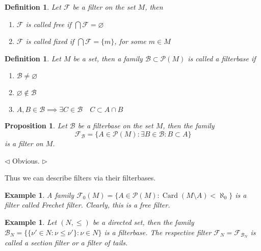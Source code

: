 \documentclass[12pt]{article}
\newtheorem{proposition}[theorem]{Proposition}
\newtheorem{definition}[theorem]{Definition}
\newtheorem{example}[theorem]{Example}
\newenvironment{proof}{\par $\triangleleft$}{$\triangleright$}
\begin{document}
\begin{definition}\label{DefFilterTypes} Let $\mathcal{F}$ be a filter on the
    set $M$, then
    \begin{enumerate}[label = (\roman*)]
        \item $\mathcal{F}$ is called free if $\bigcap\mathcal{F}=\varnothing$
        \item $\mathcal{F}$ is called fixed if $\bigcap\mathcal{F}=\{m\}$, for
              some $m\in M$
    \end{enumerate}
\end{definition}

\begin{definition}\label{DefFilterBase} Let $M$ be a set, then a family
    $\mathcal{B}\subset\mathcal{P}(M)$ is called a filterbase if
    \begin{enumerate}[label = (\roman*)]
        \item $\mathcal{B}\neq\varnothing$
        \item $\varnothing\notin\mathcal{B}$
        \item $A,B\in\mathcal{B}\implies \exists C\in\mathcal{B}\quad C\subset
                  A\cap B$
    \end{enumerate}
\end{definition}

\begin{proposition}\label{PrFilterFromFilterBase} Let $\mathcal{B}$ be a
    filterbase on the set $M$, then the family
    $$
        \mathcal{F}_{\mathcal{B}}=
        \{A\in\mathcal{P}(M):\exists B\in\mathcal{B}: B\subset A\}
    $$
    is a filter on $M$.
\end{proposition}
\begin{proof} Obvious.
\end{proof}

Thus we can describe filters via their filterbases.

\begin{example}\label{ExFrechetFilter} A family
    $\mathcal{F}_0(M)=\{A\in\mathcal{P}(M):\operatorname{Card}(M\setminus A)
    <\aleph_0\}$ is a filter called Frechet filter. Clearly, this is 
    a free filter.
\end{example}

\begin{example}\label{ExSectionFilter} Let $(N,\leq )$ be a directed set, then
    the family $\mathcal{B}_N=\{ \{\nu'\in N:\nu\leq\nu'\}:\nu\in N\}$ is a
    filterbase. The respective filter
    $\mathcal{F}_N=\mathcal{F}_{\mathcal{B}_N}$ is called a section filter or a
    filter of tails.
\end{example}
\end{document}
